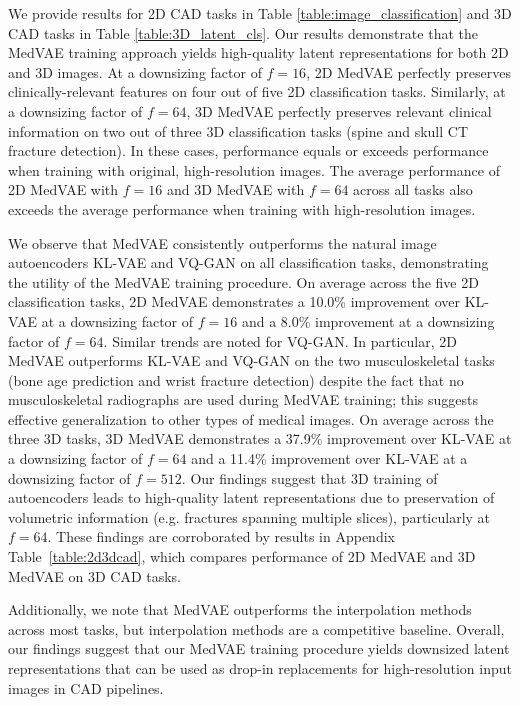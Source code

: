We provide results for 2D CAD tasks in Table \ref{table:image_classification} and 3D CAD tasks in Table \ref{table:3D_latent_cls}. Our results demonstrate that the MedVAE training approach yields high-quality latent representations for both 2D and 3D images. At a downsizing factor of $f=16$, 2D MedVAE perfectly preserves clinically-relevant features on four out of five 2D classification tasks. Similarly, at a downsizing factor of $f=64$, 3D MedVAE perfectly preserves relevant clinical information on two out of three 3D classification tasks (spine and skull CT fracture detection). In these cases, performance equals or exceeds performance when training with original, high-resolution images. The average performance of 2D MedVAE with $f=16$ and 3D MedVAE with $f=64$ across all tasks also exceeds the average performance when training with high-resolution images.  

We observe that MedVAE consistently outperforms the natural image autoencoders KL-VAE and VQ-GAN on all classification tasks, demonstrating the utility of the MedVAE training procedure. On average across the five 2D classification tasks, 2D MedVAE demonstrates a 10.0\% improvement over KL-VAE at a downsizing factor of $f=16$ and a 8.0\% improvement at a downsizing factor of $f=64$. Similar trends are noted for VQ-GAN. %
In particular, 2D MedVAE outperforms KL-VAE and VQ-GAN on the two musculoskeletal tasks (bone age prediction and wrist fracture detection) despite the fact that no musculoskeletal radiographs are used during MedVAE training; this suggests effective generalization to other types of medical images. On average across the three 3D tasks, 3D MedVAE demonstrates a 37.9\% improvement over KL-VAE at a downsizing factor of $f=64$ and a 11.4\% improvement over KL-VAE at a downsizing factor of $f=512$. Our findings suggest that 3D training of autoencoders leads to high-quality latent representations due to preservation of volumetric information (e.g. fractures spanning multiple slices), particularly at $f=64$. These findings are corroborated by results in Appendix Table~\ref{table:2d3dcad}, which compares performance of 2D MedVAE and 3D MedVAE on 3D CAD tasks.

Additionally, we note that MedVAE outperforms the interpolation methods across most tasks, but interpolation methods are a competitive baseline. Overall, our findings suggest that our MedVAE training procedure yields downsized latent representations that can be used as drop-in replacements for high-resolution input images in CAD pipelines. 

